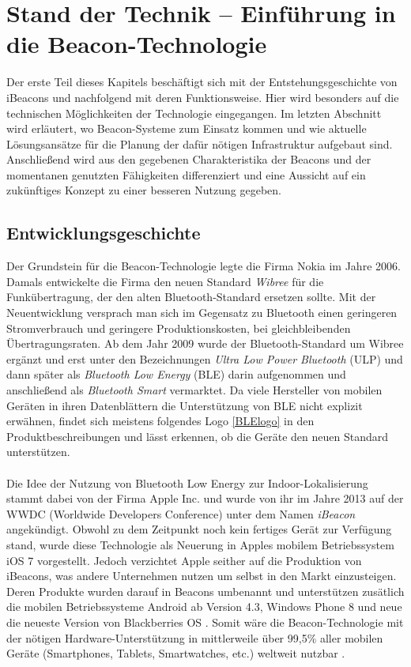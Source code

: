 \chapter{Stand der Technik -- Einführung in die Beacon-Technologie}
Der erste Teil dieses Kapitels beschäftigt sich mit der Entstehungsgeschichte von iBeacons und nachfolgend mit deren Funktionsweise. Hier wird besonders auf die technischen Möglichkeiten der Technologie eingegangen. Im letzten Abschnitt wird erläutert, wo Beacon-Systeme zum Einsatz kommen und wie aktuelle Lösungsansätze für die Planung der dafür nötigen Infrastruktur aufgebaut sind. Anschließend wird aus den gegebenen Charakteristika der Beacons und der momentanen genutzten Fähigkeiten differenziert und eine Aussicht auf ein zukünftiges Konzept zu einer besseren Nutzung gegeben.
\section{Entwicklungsgeschichte}
Der Grundstein für die Beacon-Technologie legte die Firma Nokia im Jahre 2006. Damals entwickelte die Firma den neuen Standard \textit{Wibree} für die Funkübertragung, der den alten Bluetooth-Standard ersetzen sollte. Mit der Neuentwicklung versprach man sich im Gegensatz zu Bluetooth einen geringeren Stromverbrauch und geringere Produktionskosten, bei gleichbleibenden Übertragungsraten. Ab dem Jahr 2009 wurde der Bluetooth-Standard um Wibree ergänzt und erst unter den Bezeichnungen \textit{Ultra Low Power Bluetooth} (ULP) und dann später als \textit{Bluetooth Low Energy} (BLE) darin aufgenommen \cite{Wib2BLE} und anschließend als \textit{Bluetooth Smart} vermarktet. Da viele Hersteller von mobilen Geräten in ihren Datenblättern die Unterstützung von BLE nicht explizit erwähnen, findet sich meistens folgendes Logo \ref{BLElogo} in den Produktbeschreibungen und lässt erkennen, ob die Geräte den neuen Standard unterstützen. \\ \\
Die Idee der Nutzung von Bluetooth Low Energy zur Indoor-Lokalisierung stammt dabei von der Firma Apple Inc. und wurde von ihr im Jahre 2013 auf der WWDC (Worldwide Developers Conference)\cite{Apple} unter dem Namen \textit{iBeacon} angekündigt. Obwohl zu dem Zeitpunkt noch kein fertiges Gerät zur Verfügung stand, wurde diese Technologie als Neuerung in Apples mobilem Betriebssystem iOS 7 vorgestellt. Jedoch verzichtet Apple seither auf die Produktion von iBeacons, was andere Unternehmen nutzen um selbst in den Markt einzusteigen. Deren Produkte wurden darauf in Beacons umbenannt und unterstützen zusätlich die mobilen Betriebssysteme Android ab Version 4.3, Windows Phone 8 und neue die neueste Version von Blackberries OS \cite{Bibel}. Somit wäre die Beacon-Technologie mit der nötigen Hardware-Unterstützung in mittlerweile über 99,5\% aller mobilen Geräte (Smartphones, Tablets, Smartwatches, etc.) weltweit nutzbar \cite{MobGerSt}. \par\bigskip
